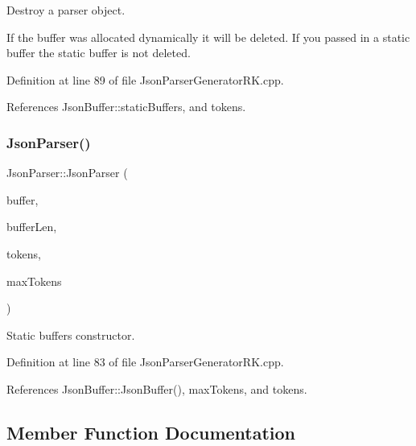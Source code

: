 Destroy a parser object. 

If the buffer was allocated dynamically it will be deleted. If you passed in a static buffer the static buffer is not deleted. 

Definition at line 89 of file Json\+Parser\+Generator\+R\+K.\+cpp.



References Json\+Buffer\+::static\+Buffers, and tokens.

\mbox{\label{class_json_parser_a394f8fa82e72240ce4ad6e6ca25700b6}} 
\subsubsection{\texorpdfstring{Json\+Parser()}{JsonParser()}\hspace{0.1cm}{\footnotesize\ttfamily [2/2]}}
{\footnotesize\ttfamily Json\+Parser\+::\+Json\+Parser (\begin{DoxyParamCaption}\item[{char $\ast$}]{buffer,  }\item[{size\+\_\+t}]{buffer\+Len,  }\item[{\hyperlink{struct_json_parser_generator_r_k_1_1jsmntok__t}{Json\+Parser\+Generator\+R\+K\+::jsmntok\+\_\+t} $\ast$}]{tokens,  }\item[{size\+\_\+t}]{max\+Tokens }\end{DoxyParamCaption})}



Static buffers constructor. 



Definition at line 83 of file Json\+Parser\+Generator\+R\+K.\+cpp.



References Json\+Buffer\+::\+Json\+Buffer(), max\+Tokens, and tokens.



\subsection{Member Function Documentation}
\mbox{\label{class_json_parser_a1731e3265d6b2f89587638dcd6d7ff34}} 
